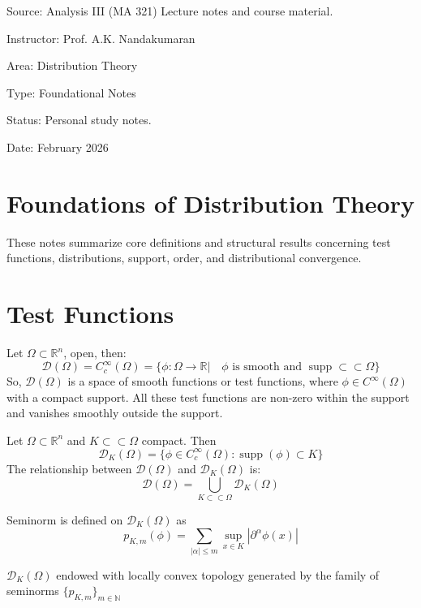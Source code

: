 Source:
Analysis III (MA 321)
Lecture notes and course material.

Instructor: Prof. A.K. Nandakumaran

Area:
Distribution Theory

Type:
Foundational Notes

Status:
Personal study notes.

Date:
February 2026
\section*{Foundations of Distribution Theory}
These notes summarize core definitions and structural results concerning test functions, distributions, support, order, and distributional convergence. 

\section{Test Functions}
\begin{definition}
    Let $\Omega\subset \mathbb{R}^n$, open, then:
    \[
    \mathcal{D}(\Omega)= C_c^\infty(\Omega)=\{\phi:\Omega\to \mathbb{R}|\quad\text{$\phi$ is smooth and $\operatorname{supp}\subset\subset\Omega$\} }
    \]
    So, $\mathcal{D}(\Omega)$ is a space of smooth functions or test functions, where $\phi\in C^\infty(\Omega)$ with a compact support. All these test functions are non-zero within the support and vanishes smoothly outside the support.
    \end{definition}
    \begin{definition}
    Let $\Omega\subset\mathbb{R}^n$ and $K\subset\subset\Omega$ compact. Then
    \[
    \mathcal{D}_K(\Omega)=\{\phi\in C_c^\infty(\Omega):\operatorname{supp}(\phi)\subset K\}
    \]
    The relationship between $\mathcal{D}(\Omega)$ and $\mathcal{D}_K(\Omega)$ is:
    \[
    \mathcal{D}(\Omega)=\bigcup_{K\subset\subset\Omega}\mathcal{D}_K(\Omega)
    \]
    \end{definition}
\begin{definition}[Seminorms]
    Seminorm is defined on $\mathcal{D}_K(\Omega)$ as
    \[
    p_{K,m}(\phi) = \sum_{|\alpha|\le m}\sup_{x\in K}|\partial^\alpha\phi(x)|
    \]
    \begin{remark}
        $\mathcal{D}_K(\Omega)$ endowed with locally convex topology generated by the family of seminorms $\{p_{K,m}\}_{m\in\mathbb{N}}$
    \end{remark}
\end{definition}
